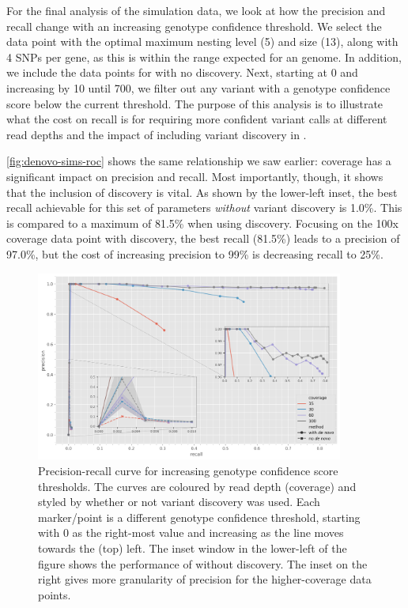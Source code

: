For the final analysis of the simulation data, we look at how the precision and recall change with an increasing genotype confidence threshold. We select the data point with the optimal maximum nesting level (5) and \denovo{} \kmer{} size (13), along with 4 SNPs per gene, as this is within the range expected for an \ecoli{} genome. In addition, we include the data points for \pandora{} with no \denovo{} discovery. Next, starting at 0 and increasing by 10 until 700, we filter out any variant with a genotype confidence score below the current threshold. The purpose of this analysis is to illustrate what the cost on recall is for requiring more confident variant calls at different read depths and the impact of including \denovo{} variant discovery in \pandora{}. 

\autoref{fig:denovo-sims-roc} shows the same relationship we saw earlier: coverage has a significant impact on precision and recall. Most importantly, though, it shows that the inclusion of \denovo{} discovery is vital. As shown by the lower-left inset, the best recall achievable for this set of parameters \emph{without} variant discovery is 1.0\%. This is compared to a maximum of 81.5\% when using \denovo{} discovery. Focusing on the 100x coverage data point with \denovo{} discovery, the best recall (81.5\%) leads to a precision of 97.0\%, but the cost of increasing precision to 99\% is decreasing recall to 25\%. 

\begin{figure}
    \centering
    \includegraphics[width=0.9\textwidth]{Chapter1/Figs/denovo-sims-roc.png}
    \caption{Precision-recall curve for increasing genotype confidence score thresholds. The curves are coloured by read depth (coverage) and styled by whether or not \denovo{} variant discovery was used. Each marker/point is a different genotype confidence threshold, starting with 0 as the right-most value and increasing as the line moves towards the (top) left. The inset window in the lower-left of the figure shows the performance of \pandora{} without \denovo{} discovery. The inset on the right gives more granularity of precision for the higher-coverage data points.}
    \label{fig:denovo-sims-roc}
\end{figure}

